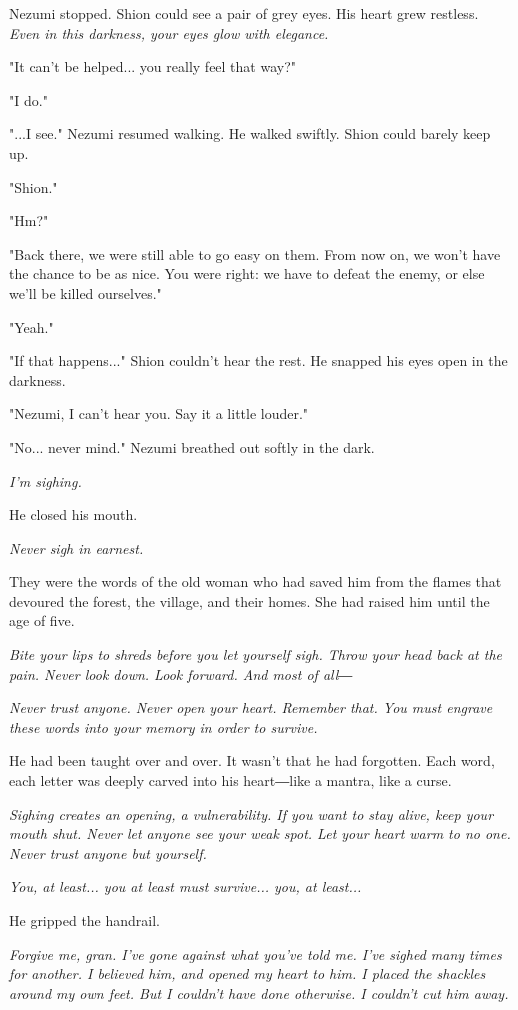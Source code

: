 Nezumi stopped. Shion could see a pair of grey eyes. His heart grew
restless. \emph{Even in this darkness, your eyes glow with elegance.}

"It can't be helped... you really feel that way?"

"I do."

"...I see." Nezumi resumed walking. He walked swiftly. Shion could
barely keep up.

"Shion."

"Hm?"

"Back there, we were still able to go easy on them. From now on, we
won't have the chance to be as nice. You were right: we have to defeat
the enemy, or else we'll be killed ourselves."

"Yeah."

"If that happens..." Shion couldn't hear the rest. He snapped his eyes
open in the darkness.

"Nezumi, I can't hear you. Say it a little louder."

"No... never mind." Nezumi breathed out softly in the dark.

\emph{I'm sighing.}

He closed his mouth.

\emph{Never sigh in earnest.}

They were the words of the old woman who had saved him from the flames
that devoured the forest, the village, and their homes. She had raised
him until the age of five.

\emph{Bite your lips to shreds before you let yourself sigh. Throw your head
	back at the pain. Never look down. Look forward. And most of all―}

\emph{Never trust anyone. Never open your heart. Remember that. You must
	engrave these words into your memory in order to survive.}

He had been taught over and over. It wasn't that he had forgotten. Each
word, each letter was deeply carved into his heart―like a mantra, like a
curse.

\emph{Sighing creates an opening, a vulnerability. If you want to stay alive,
	keep your mouth shut. Never let anyone see your weak spot. Let your
	heart warm to no one. Never trust anyone but yourself.}

\emph{You, at least... you at least must survive... you, at least...}

He gripped the handrail.

\emph{Forgive me, gran. I've gone against what you've told me. I've sighed
	many times for another. I believed him, and opened my heart to him. I
	placed the shackles around my own feet. But I couldn't have done
	otherwise. I couldn't cut him away.}

